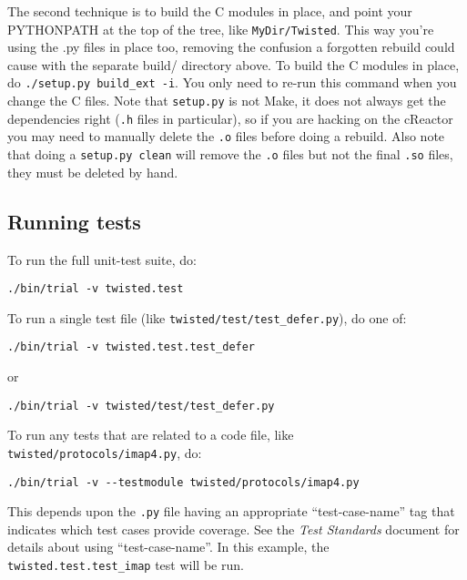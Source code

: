 The second technique is to build the C modules in place, and point your PYTHONPATH at the top of the tree, like \texttt{My\linebreak[1]Dir/Twisted}. This way you're using the .py files in place too, removing the confusion a forgotten rebuild could cause with the separate build/ directory above. To build the C modules in place, do \texttt{./setup.\linebreak[1]py build\_ext -i}. You only need to re-run this command when you change the C files. Note that \texttt{setup.\linebreak[1]py} is not Make, it does not always get the dependencies right (\texttt{.h} files in particular), so if you are hacking on the cReactor you may need to manually delete the \texttt{.o} files before doing a rebuild. Also note that doing a \texttt{setup.\linebreak[1]py clean} will remove the \texttt{.o} files but not the final \texttt{.so} files, they must be deleted by hand.

\subsection{Running tests}


To run the full unit-test suite, do:\begin{verbatim}
./bin/trial -v twisted.test
\end{verbatim}


To run a single test file (like \texttt{twisted/test/test\_defer.\linebreak[1]py}), do one of:\begin{verbatim}
./bin/trial -v twisted.test.test_defer
\end{verbatim}


or\begin{verbatim}
./bin/trial -v twisted/test/test_defer.py
\end{verbatim}


To run any tests that are related to a code file, like \texttt{twisted/protocols/imap4.\linebreak[1]py}, do:\begin{verbatim}
./bin/trial -v --testmodule twisted/protocols/imap4.py
\end{verbatim}


This depends upon the \texttt{.py} file having an appropriate ``test-case-name'' tag that indicates which test cases provide coverage. See the \textit{Test Standards} document for details about using ``test-case-name''. In this example, the \texttt{twisted.\linebreak[1]test.\linebreak[1]test\_imap} test will be run.

